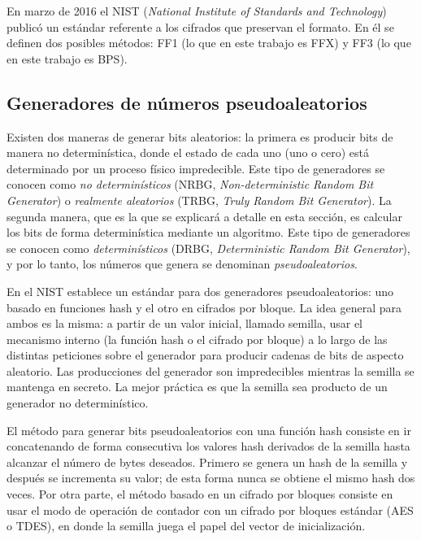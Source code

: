 En marzo de 2016 el NIST (\textit{National Institute of Standards and
Technology}) publicó un estándar referente a los cifrados que preservan el
formato\cite{nist_fpe}. En él se definen dos posibles métodos: FF1 (lo que en
este trabajo es FFX) y FF3 (lo que en este trabajo es BPS).


\subsection{Generadores de números pseudoaleatorios}

Existen dos maneras de generar bits aleatorios: la primera es producir bits de
manera no determinística, donde el estado de cada uno (uno o cero) está
determinado por un proceso físico impredecible. Este tipo de generadores se
conocen como \textit{no determinísticos} (NRBG, \textit{Non-deterministic Random
Bit Generator}) o \textit{realmente aleatorios} (TRBG, \textit{Truly Random Bit
Generator}). La segunda manera, que es la que se explicará a detalle en esta
sección, es calcular los bits de forma determinística mediante un algoritmo.
Este tipo de generadores se conocen como \textit{determinísticos} (DRBG,
\textit{Deterministic Random Bit Generator}), y por lo tanto, los números que
genera se denominan \textit{pseudoaleatorios}.

En \cite{nist_aleatorios} el NIST establece un estándar para dos generadores
pseudoaleatorios: uno basado en funciones hash y el otro en cifrados por bloque.
La idea general para ambos es la misma: a partir de un valor inicial, llamado
semilla, usar el mecanismo interno (la función hash o el cifrado por bloque) a
lo largo de las distintas peticiones sobre el generador para producir cadenas de
bits de aspecto aleatorio. Las producciones del generador son impredecibles
mientras la semilla se mantenga en secreto. La mejor práctica es que la semilla
sea producto de un generador no determinístico.


El método para generar bits pseudoaleatorios con una función hash consiste en ir
concatenando de forma consecutiva los valores hash derivados de la semilla hasta
alcanzar el número de bytes deseados. Primero se genera un hash de la semilla y
después se incrementa su valor; de esta forma nunca se obtiene el mismo hash dos
veces. Por otra parte, el método basado en un cifrado por bloques consiste en
usar el modo de operación de contador con un cifrado por bloques estándar (AES o
TDES), en donde la semilla juega el papel del vector de inicialización.
